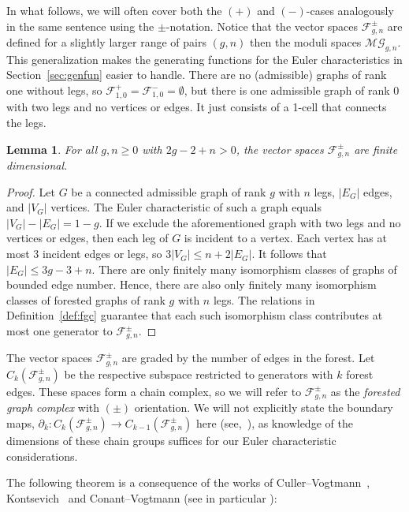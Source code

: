 \documentclass[oneside]{amsart}
\newtheorem{lemma}[theorem]{Lemma}
\theoremstyle{remark}
\newcommand{\MG}{\mathcal{MG}}
\newcommand{\F}{\mathcal{F}}
\begin{document}
In what follows, we will often cover both the $(+)$ and $(-)$-cases analogously in the same sentence using the $\pm$-notation.
Notice that the vector spaces $\F_{g,n}^\pm$ are defined for a slightly larger range of pairs $(g,n)$ then the moduli spaces $\MG_{g,n}$. This generalization makes the generating functions for the Euler characteristics in Section~\ref{sec:genfun} easier to handle.
There are no (admissible) graphs of rank one without legs, so 
$\F_{1,0}^{+} = \F_{1,0}^{-} = \emptyset$, 
but there is one admissible graph of rank $0$ with two legs and no vertices or edges. 
It just consists of a 1-cell that connects the legs.

\begin{lemma}
\label{lmm:finite}
For all $g,n \geq 0$ with $2g-2+n > 0$,
the vector spaces $\F_{g,n}^{\pm}$ 
are finite dimensional.
\end{lemma}
\begin{proof}
Let $G$ be a connected admissible graph of rank $g$ with $n$ legs, $|E_G|$ edges, and $|V_G|$ vertices. The Euler characteristic of such a graph equals  $|V_G| - |E_G| = 1-g$. 
If we exclude the aforementioned graph with two legs and no vertices or edges, then each leg of $G$ is incident to a vertex.
Each vertex has at most 3 incident edges or legs, so $3|V_G|\leq n+2|E_G|$.
It follows that $|E_G| \leq 3g-3+n$. There are only finitely many isomorphism classes of graphs of bounded edge number.
Hence, there are also only finitely many isomorphism classes of forested graphs of rank $g$ with $n$ legs. The relations in Definition~\ref{def:fgc} guarantee that each such isomorphism class contributes at most one generator to $\F_{g,n}^{\pm}$.
\end{proof}

The vector spaces $\F_{g,n}^{\pm}$ are graded by the number of edges in the forest. Let 
$C_k(\F_{g,n}^{\pm})$ be the respective subspace restricted to generators with $k$ forest edges.
%
%
%
%
%
%
%
%
%
%
%
%
%
%
%
%
%
%
%
These spaces form a chain complex, so we will refer to $\F_{g,n}^\pm$ as the \emph{forested graph complex} with $(\pm)$ orientation.
We will not explicitly state the boundary maps, $\partial_k: C_k(\F_{g,n}^{\pm})\rightarrow C_{k-1} (\F_{g,n}^{\pm})$ here (see,~\cite{CoVo}), as knowledge of the dimensions of these chain groups suffices for our Euler characteristic considerations.
%
%
%
%
%
%
%
%
%
%
%
%

The following theorem is a consequence of the works of Culler--Vogtmann~\cite{CV}, Kontsevich~\cite{Ko1,Ko2} and Conant--Vogtmann \cite{CoVo} (see in particular \cite[Sec.~3.1--3.2]{CoVo}):
\end{document}
